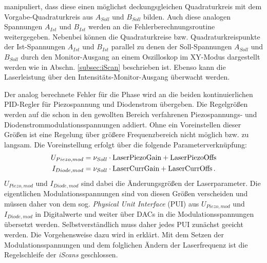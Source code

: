 manipuliert, dass diese einen möglichst deckungsgleichen Quadraturkreis mit dem
Vorgabe-Quadraturkreis aus $A_{Soll}$ und $B_{Soll}$ bilden. Auch diese analogen
Spannungen $A_{Ist}$ und $B_{Ist}$ werden an die Fehlerberechnungsroutine
weitergegeben. Nebenbei können die Quadraturkreise bzw. Quadraturkreispunkte der
Ist-Spannungen $A_{Ist}$ und $B_{Ist}$ parallel zu denen der Soll-Spannungen
$A_{Soll}$ und $B_{Soll}$ durch den Monitor-Ausgang an einem Oszilloskop im
XY-Modus dargestellt werden wie in Abschn. \ref{subsec:iScan} beschrieben ist.
Ebenso kann die Laserleistung über den Intensitäts-Monitor-Ausgang überwacht
werden.\par Der analog berechnete Fehler für die Phase wird an die beiden
kontinuierlichen PID-Regler für Piezospannung und Diodenstrom übergeben. Die
Regelgrößen werden auf die schon in den gewollten Bereich verfahrenen
Piezospannungs- und Diodenstrommodulationsspannungen addiert. Ohne ein
Voreinstellen dieser Größen ist eine Regelung über größere Frequenzbereich nicht
möglich bzw. zu langsam. Die Voreinstellung erfolgt über die folgende
Parameterverknüpfung:
\begin{equation}\label{eq:iscan_PUs}
	\begin{split}
		U_{Piezo,mod}&=\nu_{Soll}\cdot\text{\lstinline|LaserPiezoGain|}+\text{\lstinline|LaserPiezoOffs|}\\
		I_{Diode,mod}&=\nu_{Soll}\cdot\text{\lstinline|LaserCurrGain|}+\text{\lstinline|LaserCurrOffs|}\,.
	\end{split}
\end{equation}
$U_{Piezo,mod}$ und $I_{Diode,mod}$ sind dabei die Änderungsgrößen der
Laserparameter. Die eigentlichen Modulationsspannungen
sind von diesen Größen verscheiden und müssen daher von dem sog.
\textit{Physical Unit Interface} (PUI) aus $U_{Piezo,mod}$ und $I_{Diode,mod}$ in Digitalwerte und weiter über DACs in die Modulationsspannungen übersetzt werden.
Selbstverständlich muss daher jedes PUI zunächst geeicht werden. Die
Vorgehensweise dazu wird in \cite{iscan_hardware_guide}
erklärt. Mit dem Setzen der Modulationsspannungen und dem folglichen Ändern der
Laserfrequenz ist die Regelschleife der \textit{iScans} geschlossen.

